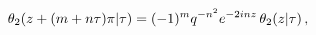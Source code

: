 \[\mathop{\theta_{2}\/}\nolimits\!\left(z+(m+n\tau)\pi\middle|\tau\right)=(-1)^{%
m}q^{-n^{2}}e^{-2inz}\mathop{\theta_{2}\/}\nolimits\!\left(z\middle|\tau\right),\]
